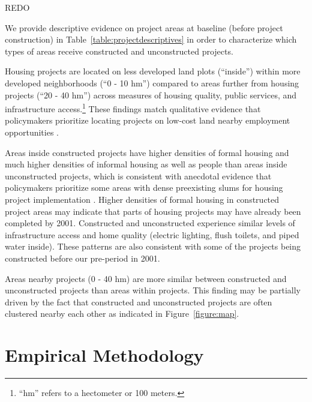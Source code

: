 \documentclass[12pt]{article}
\newcommand{\hmref}{
	``hm'' refers to a hectometer or 100 meters.
}
\begin{document}
REDO

We provide descriptive evidence on project areas at baseline (before project construction) in Table~\ref{table:projectdescriptives} in order to characterize which types of areas receive constructed and unconstructed projects.

Housing projects are located on less developed land plots (``inside'') within more developed neighborhoods (``0 - 10 hm'') compared to areas further from housing projects (``20 - 40 hm'') across measures of housing quality, public services, and infrastructure access.\footnote{\hmref}  These findings match qualitative evidence that policymakers prioritize locating projects on low-cost land nearby employment opportunities \citep{beninterview}.

Areas inside constructed projects have higher densities of formal housing and much higher densities of informal housing as well as people than areas inside unconstructed projects, which is consistent with anecdotal evidence that policymakers prioritize some areas with dense preexisting slums for housing project implementation \citep{hofmeyr2008risk}.  Higher densities of formal housing in constructed project areas may indicate that parts of housing projects may have already been completed by 2001.  Constructed and unconstructed experience similar levels of infrastructure access and home quality (electric lighting, flush toilets, and piped water inside).  These patterns are also consistent with some of the projects being constructed before our pre-period in 2001.

Areas nearby projects (0 - 40 hm) are more similar between constructed and unconstructed projects than areas within projects.  This finding may be partially driven by the fact that constructed and unconstructed projects are often clustered nearby each other as indicated in Figure~\ref{figure:map}.






\section{Empirical Methodology}\label{section:methodology}
\end{document}
